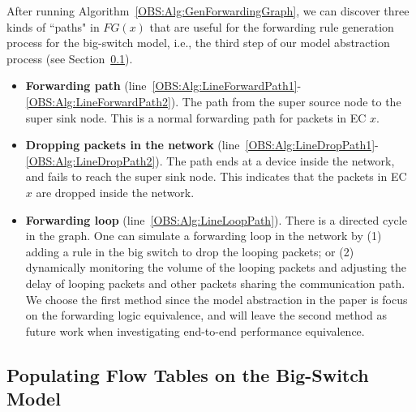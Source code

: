 After running Algorithm~\ref{OBS:Alg:GenForwardingGraph}, we can discover three kinds of ``paths" in $FG(x)$
that are useful for the forwarding rule generation process for the big-switch model,
i.e., the third step of our model abstraction process (see Section~\ref{OBS:Sec:PopulateFlowTable}).

\begin{itemize}
    \item \textbf{Forwarding path} (line~\ref{OBS:Alg:LineForwardPath1}-\ref{OBS:Alg:LineForwardPath2}).
        The path from the super source node to the super sink node.
        This is a normal forwarding path for packets in EC $x$.

    \item \textbf{Dropping packets in the network} (line~\ref{OBS:Alg:LineDropPath1}-\ref{OBS:Alg:LineDropPath2}).
        The path ends at a device inside the network, and fails to reach the super sink node. This indicates that the packets in EC $x$ are dropped inside the network.

    \item \textbf{Forwarding loop} (line~\ref{OBS:Alg:LineLoopPath}).
        There is a directed cycle in the graph. One can simulate a forwarding loop in the network by (1) adding a rule in the big switch to drop the looping packets; or (2) dynamically monitoring the volume of the looping packets and adjusting the delay of looping packets and other packets sharing the communication path. We choose the first method since the model abstraction in the paper is focus on the forwarding logic equivalence, and will leave the second method as future work when investigating end-to-end performance equivalence.
\end{itemize}

\subsection{Populating Flow Tables on the Big-Switch Model}
\label{OBS:Sec:PopulateFlowTable}

